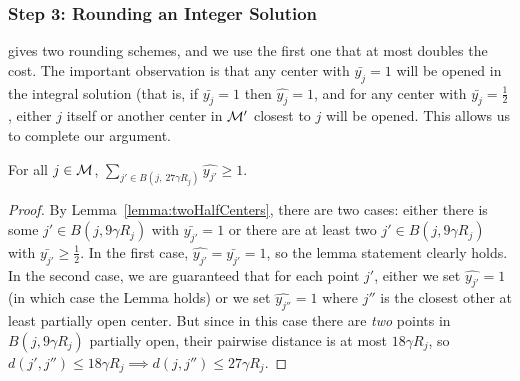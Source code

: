 \subsubsection{Step 3: Rounding an Integer Solution}
\cite{kMedianLP} gives two rounding schemes, and we use the first one that at most doubles the cost. The important observation is that any center with $\bar{y_j} = 1$ will be opened in the integral solution (that is, if $\bar{y_j} = 1$ then $\hat{y_j}=1$, and for any center with $\bar{y_j}=\frac{1}{2}$, either $j$ itself or another center in $\mathcal{M}'$ closest to $j$ will be opened. This allows us to complete our argument. %

\begin{lemma}
    For all $j \in \mathcal{M}$, $\sum_{j' \in B(j, \, 27 \gamma R_j)} \hat{y_{j'}} \geq 1$.
\end{lemma}
\begin{proof}
    By Lemma~\ref{lemma:twoHalfCenters}, there are two cases: either there is some $j' \in B(j, 9 \gamma R_j)$ with $\bar{y_{j'}} = 1$ or there are at least two $j' \in B(j, 9 \gamma R_j)$ with $\bar{y_{j'}} \geq \frac{1}{2}$. In the first case, $\hat{y_{j'}} = \bar{y_{j'}} = 1$, so the lemma statement clearly holds. In the second case, we are guaranteed that for each point $j'$, either we set $\hat{y_{j'}} = 1$ (in which case the Lemma holds) or we set $\hat{y_{j''}} = 1$ where $j''$ is the closest other at least partially open center. But since in this case there are \textit{two} points in $B(j, 9 \gamma R_j)$ partially open, their pairwise distance is at most $18 \gamma R_j$, so $d(j', j'') \leq 18 \gamma R_j \implies d(j, j'') \leq 27 \gamma R_j.$
\end{proof}


